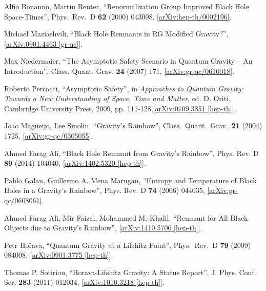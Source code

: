 \documentclass[12pt]{article}
\newcommand{\2}{$^2$}
\newcommand{\3}{$^3$}
\newcommand{\4}{$_4$}
\newcommand{\5}{$_5$}
\begin{document}
\begin{thebibliography}{400}
  Alfio Bonanno, Martin Reuter,
  ``Renormalization Group Improved Black Hole Space-Times'',
  Phys.\ Rev.\ D {\bf 62} (2000) 043008,
  \href{http://arxiv.org/abs/hep-th/0002196}{[arXiv:hep-th/0002196]}.

Michael Maziashvili, ``Black Hole Remnants in RG Modified Gravity?'', \href{http://arxiv.org/abs/0901.4463}{[arXiv:0901.4463 [gr-qc]]}.

Max Niedermaier, ``The Asymptotic Safety Scenario in Quantum Gravity -- An Introduction'', 	Class. Quant. Grav. \textbf{24} (2007) 171, \href{http://arxiv.org/abs/gr-qc/0610018}{[arXiv:gr-qc/0610018]}.

Roberto Percacci, ``Asymptotic Safety'', in \emph{Approaches to Quantum Gravity: Towards a New Understanding of Space, Time and Matter}, ed. D. Oriti, Cambridge University Press, 2009, pp. 111-128,\href{http://arxiv.org/abs/0709.3851}{[arXiv:0709.3851 [hep-th]]}.

Joao Magueijo, Lee Smolin,
  ``Gravity's Rainbow'',
  Class.\ Quant.\ Grav.\  {\bf 21} (2004) 1725,  
  \href{http://arxiv.org/abs/gr-qc/0305055}{[arXiv:gr-qc/0305055]}.

Ahmed Farag Ali, ``Black Hole Remnant from Gravity's Rainbow'', 	Phys. Rev. D \textbf{89} (2014) 104040, \href{http://arxiv.org/abs/1402.5320}{[arXiv:1402.5320 [hep-th]]}.

Pablo Galan, Guillermo A. Mena Marugan, ``Entropy and Temperature of Black Holes in a Gravity's Rainbow'', Phys. Rev. D \textbf{74} (2006) 044035, \href{http://arxiv.org/abs/gr-qc/0608061}{[arXiv:gr-qc/0608061]}.


Ahmed Farag Ali, Mir Faizal, Mohammed M. Khalil, ``Remnant for All Black Objects due to Gravity's Rainbow'', \href{http://arxiv.org/abs/1410.5706}{[arXiv:1410.5706 [hep-th]]}.

  Petr Ho\v{r}ava,
  ``Quantum Gravity at a Lifshitz Point'',
  Phys.\ Rev.\ D {\bf 79} (2009) 084008,
  \href{http://arxiv.org/abs/0901.3775}{[arXiv:0901.3775 [hep-th]]}.
	
Thomas P. Sotiriou,
``Horava-Lifshitz Gravity: A Status Report'',  	J. Phys. Conf. Ser. \textbf{283} (2011) 012034, \href{http://arxiv.org/abs/1010.3218}{[arXiv:1010.3218 [hep-th]]}.


\end{thebibliography}
\end{document}
